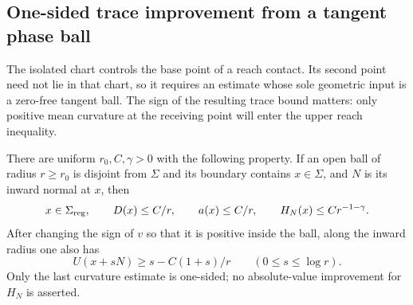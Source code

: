 \subsection{One-sided trace improvement from a tangent phase ball}

The isolated chart controls the base point of a reach contact.  Its
second point need not lie in that chart, so it requires an estimate
whose sole geometric input is a zero-free tangent ball.  The sign of
the resulting trace bound matters: only positive mean curvature at the
receiving point will enter the upper reach inequality.

\begin{lemma}\label{lem:reach-phase-ball}
There are uniform $r_0,C,\gamma>0$ with the following property.
If an open ball of radius $r\ge r_0$ is disjoint from $\Sigma$ and
its boundary contains $x\in\Sigma$, and $N$ is its inward normal at
$x$, then
\begin{equation}\label{eq:C5}
 x\in\Sigma_{\rm reg},\qquad D(x)\le C/r,
 \qquad a(x)\le C/r,\qquad H_N(x)\le Cr^{-1-\gamma}.
\end{equation}
After changing the sign of $v$ so that it is positive inside the
ball, along the inward radius one also has
\begin{equation}\label{eq:C6}
 U(x+sN)\ge s-C(1+s)/r\qquad(0\le s\le\log r).
\end{equation}
Only the last curvature estimate is one-sided; no absolute-value
improvement for $H_N$ is asserted.
\end{lemma}

